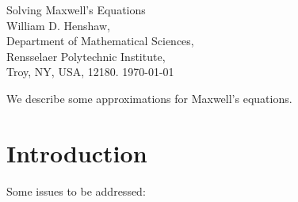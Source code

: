 \documentclass[10pt]{article}
\begin{document}



\newcommand{\Div}{\grad\cdot}
\newcommand{\tauv}{\boldsymbol{\tau}}
\newcommand{\kappav}{\boldsymbol{\kappa}}
\newcommand{\sumi}{\sum_{i=1}^n}
\newcommand{\deltaT}{{\Delta t}}
\newcommand{\dt}{{\Delta t}}

\vspace{5\baselineskip}
\begin{flushleft}
{\LARGE Solving Maxwell's Equations} \\
\vspace{2\baselineskip}
William D. Henshaw,\\
Department of Mathematical Sciences, \\
Rensselaer Polytechnic Institute, \\
Troy, NY, USA, 12180.
\vspace{\baselineskip}
\today\\

\vspace{2\baselineskip}


We describe some approximations for Maxwell's equations.

\end{flushleft}

\tableofcontents

\newcommand{\eps}{\epsilon}

\section{Introduction}

  Some issues to be addressed:
\end{document}

